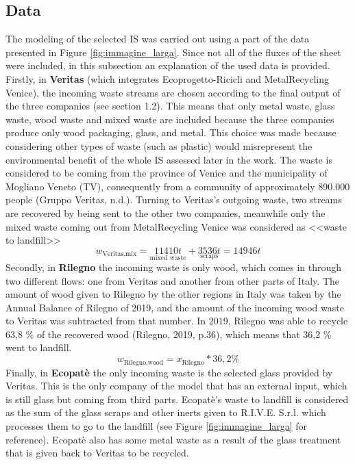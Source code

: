 \subsection{Data}
The modeling of the selected IS was carried out using a part of the data presented in Figure \ref{fig:immagine_larga}. Since not all of the fluxes of the sheet were included, in this subsection an explanation of the used data is provided. \\

\noindent Firstly, in \textbf{Veritas} (which integrates Ecoprogetto-Ricicli and MetalRecycling Venice), the incoming waste streams are chosen according to the final output of the three companies (see section 1.2). This means that only metal waste, glass waste, wood waste and mixed waste are included because the three companies produce only wood packaging, glass, and metal. This choice was made because considering other types of waste (such as plastic) would misrepresent the environmental benefit of the whole IS assessed later in the work. The waste is considered to be coming from the province of Venice and the municipality of Mogliano Veneto (TV), consequently from a community of approximately 890.000 people (Gruppo Veritas, n.d.).
Turning to Veritas's outgoing waste, two streams are recovered by being sent to the other two companies, meanwhile only the mixed waste coming out from MetalRecycling Venice was considered as <<waste to landfill>> 
\begin{equation*}
    w_{\text{Veritas,mix}}=\underset{\text{mixed waste}}{11410t} + \underset{\text{scraps}}{3536t} = 14946t
\end{equation*}
Secondly, in \textbf{Rilegno} the incoming waste is only wood, which comes in through two different flows: one from Veritas and another from other parts of Italy. The amount of wood given to Rilegno by the other regions in Italy was taken by the Annual Balance of Rilegno of 2019, and the amount of the incoming wood waste to Veritas was subtracted from that number. In 2019, Rilegno was able to recycle 63,8 \% of the recovered wood (Rilegno, 2019, p.36), which means that 36,2 \% went to landfill.
\begin{equation*}
    w_{\text{Rilegno,wood}}=x_{\text{Rilegno}}*36,2\%
\end{equation*}
Finally, in \textbf{Ecopatè} the only incoming waste is the selected glass provided by Veritas. This is the only company of the model that has an external input, which is still glass but coming from third parts.
Ecopatè's waste to landfill is considered as the sum of the glass scraps and other inerts given to R.I.V.E. S.r.l. which processes them to go to the landfill (see Figure \ref{fig:immagine_larga} for reference). Ecopatè also has some metal waste as a result of the glass treatment that is given back to Veritas to be recycled.
